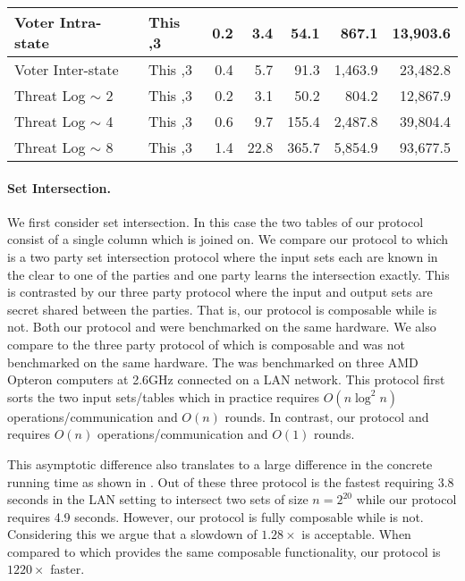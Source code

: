 \begin{figure*}[t!]
\begin{tabular}{|l |l|| r | r |r |r|r|}
		Voter Intra-state                 & This                           \hfill ,3        & 0.2   & 3.4      & 54.1     & 867.1    & 13,903.6 \\ \hline
		Voter Inter-state                 & This                           \hfill ,3        & 0.4   & 5.7      & 91.3     & 1,463.9  & 23,482.8 \\ \hline\hline
		Threat Log $\sim$ 2               & This                           \hfill ,3        & 0.2   & 3.1      & 50.2     & 804.2    & 12,867.9 \\ \hline
		Threat Log $\sim$ 4               & This                           \hfill ,3        & 0.6   & 9.7      & 155.4    & 2,487.8  & 39,804.4 \\ \hline
		Threat Log $\sim$ 8               & This                           \hfill ,3        & 1.4   & 22.8     & 365.7    & 5,854.9  & 93,677.5 \\ \hline
	\end{tabular}
	\caption{\label{fig:comm}	 }
\end{figure*}




\paragraph{Set Intersection.} We first consider set intersection. In this case the two tables of our protocol consist of a single column which is joined on. We compare our protocol to \cite{CCS:KKRT16} which is a two party set intersection protocol where the input sets each are known in the clear to one of the parties and one party learns the intersection exactly. This is contrasted by our three party protocol where the input and output sets are secret shared between the parties. That is, our protocol is composable while \cite{CCS:KKRT16} is not. Both our protocol and \cite{CCS:KKRT16} were benchmarked on the same hardware. We also compare to the three party protocol of \cite{ASIACCS:BlaAgu12} which is composable and was not benchmarked on the same hardware. The \cite{ASIACCS:BlaAgu12} was benchmarked on three AMD Opteron computers at 2.6GHz connected on a LAN network. This protocol first sorts the two input sets/tables which in practice requires $O(n\log^2 n)$ operations/communication and $O(n)$ rounds\cite{ASIACCS:BlaAgu12}. In contrast, our protocol and \cite{CCS:KKRT16} requires $O(n)$ operations/communication and $O(1)$ rounds. 

This asymptotic difference also translates to a large difference in the concrete running time as shown in . Out of these three protocol \cite{CCS:KKRT16} is the fastest requiring 3.8 seconds in the LAN setting to intersect two sets of size $n=2^{20}$ while our protocol requires 4.9 seconds. However, our protocol is fully composable while \cite{CCS:KKRT16} is not. Considering this we argue that a slowdown of $1.28\times$ is acceptable. When compared to \cite{ASIACCS:BlaAgu12} which provides the same composable functionality, our protocol is $1220\times$ faster.

